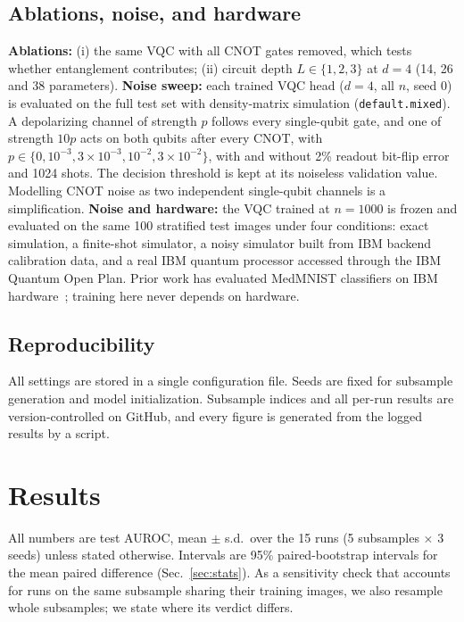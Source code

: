 \documentclass[conference]{IEEEtran}
\begin{document}
\subsection{Ablations, noise, and hardware}
\textbf{Ablations:} (i) the same VQC with all CNOT gates removed, which
tests whether entanglement contributes; (ii) circuit depth
$L\in\{1,2,3\}$ at $d=4$ (14, 26 and 38 parameters).
\textbf{Noise sweep:} each trained VQC head ($d=4$, all $n$, seed 0) is
evaluated on the full test set with density-matrix simulation
(\texttt{default.mixed}). A depolarizing channel of strength $p$ follows
every single-qubit gate, and one of strength $10p$ acts on both qubits
after every CNOT, with
$p\in\{0,10^{-3},3\times10^{-3},10^{-2},3\times10^{-2}\}$, with and
without 2\% readout bit-flip error and 1024 shots. The decision threshold
is kept at its noiseless validation value. Modelling CNOT noise as two
independent single-qubit channels is a simplification.
\textbf{Noise and hardware:} the VQC trained at
$n=1000$ is frozen and evaluated on the same 100 stratified test images
under four conditions: exact simulation, a finite-shot simulator, a noisy
simulator built from IBM backend calibration data, and a real IBM quantum
processor accessed through the IBM Quantum Open Plan. Prior work has
evaluated MedMNIST classifiers on IBM hardware~\cite{singh2025}; training
here never depends on hardware.

\subsection{Reproducibility}
All settings are stored in a single configuration file. Seeds are fixed
for subsample generation and model initialization. Subsample indices and
all per-run results are version-controlled on GitHub, and every figure is
generated from the logged results by a script.

\section{Results}
\label{sec:results}
All numbers are test AUROC, mean $\pm$ s.d.\ over the 15 runs
(5 subsamples $\times$ 3 seeds) unless stated otherwise. Intervals are 95\%
paired-bootstrap intervals for the mean paired difference
(Sec.~\ref{sec:stats}). As a sensitivity check that accounts for runs on
the same subsample sharing their training images, we also resample whole
subsamples; we state where its verdict differs.
\end{document}
